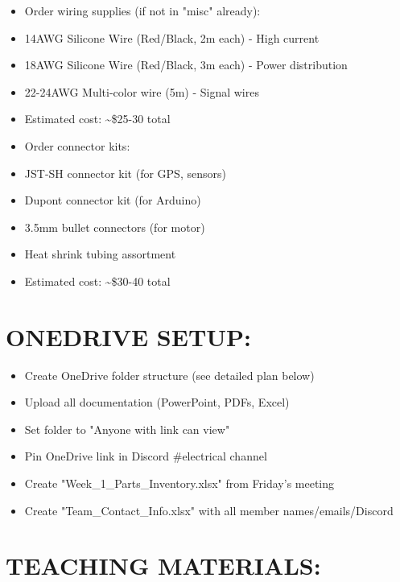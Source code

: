 \documentclass[11pt,letterpaper]{article}
\begin{document}
\begin{itemize}
  \item [WARNING]  [ ] Order wiring supplies (if not in "misc" already):
  \item 14AWG Silicone Wire (Red/Black, 2m each) - High current
  \item 18AWG Silicone Wire (Red/Black, 3m each) - Power distribution
  \item 22-24AWG Multi-color wire (5m) - Signal wires
  \item Estimated cost: \textasciitilde{}\$25-30 total
\end{itemize}

\begin{itemize}
  \item [WARNING]  [ ] Order connector kits:
  \item JST-SH connector kit (for GPS, sensors)
  \item Dupont connector kit (for Arduino)
  \item 3.5mm bullet connectors (for motor)
  \item Heat shrink tubing assortment
  \item Estimated cost: \textasciitilde{}\$30-40 total
\end{itemize}

\section{ONEDRIVE SETUP:}

\begin{itemize}
  \item [WARNING]  [ ] Create OneDrive folder structure (see detailed plan below)
  \item [WARNING]  [ ] Upload all documentation (PowerPoint, PDFs, Excel)
  \item [WARNING]  [ ] Set folder to "Anyone with link can view"
  \item [WARNING]  [ ] Pin OneDrive link in Discord \#electrical channel
\end{itemize}

\begin{itemize}
  \item  [ ] Create "Week\_1\_Parts\_Inventory.xlsx" from Friday's meeting
  \item  [ ] Create "Team\_Contact\_Info.xlsx" with all member names/emails/Discord
\end{itemize}

\section{TEACHING MATERIALS:}
\end{document}
